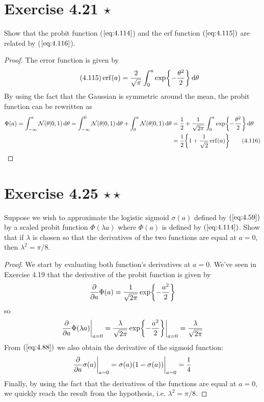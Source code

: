 \section*{Exercise 4.21 $\star$}
Show that the probit function ($\ref{eq:4.114}$) and the erf function $(\ref{eq:4.115})$ are
related by ($\ref{eq:4.116}$).

\vspace{1em}

\begin{proof}
    The error function is given by
    \begin{equation}\label{eq:4.115}\tag{4.115}
        \erf(a) = \frac{2}{\sqrt{\pi}} \int_{0}^{a} \exp{-\frac{\theta^2}{2}} \diff \theta
    \end{equation}
    By using the fact that the Gaussian is symmetric around the mean, 
    the probit function can be rewritten as
    \begin{align*}
        \Phi(a) 
        = \int_{-\infty}^{a} \mathcal{N}(\theta | 0, 1) \diff \theta
        = \int_{-\infty}^{0} \mathcal{N}(\theta | 0, 1) \diff \theta
        + \int_{0}^{a} \mathcal{N}(\theta | 0, 1) \diff \theta
        &= \frac{1}{2} + \frac{1}{\sqrt{2\pi}} \int_{0}^{a} \exp{-\frac{\theta^2}{2}} \diff \theta \\
        &= \frac{1}{2} \bigg\{1 + \frac{1}{\sqrt{2}} \erf(a)\bigg\} \label{eq:4.116}\tag{4.116}
    \end{align*}
\end{proof}

\section*{Exercise 4.25 $\star \star$}
Suppose we wish to approximate the logistic sigmoid $\sigma(a)$ 
defined by $(\ref{eq:4.59})$ by a scaled probit function
$\Phi(\lambda a)$ where $\Phi(a)$ is defined by $(\ref{eq:4.114})$.
Show that if $\lambda$ is chosen so that the derivatives of the two
functions are equal at $a = 0$, then  $\lambda^2 = \pi/8$.

\vspace{1em}

\begin{proof}
    We start by evaluating both function's derivatives at $a=0$.
    We've seen in Exercise 4.19 that the derivative of the probit function
    is given by
     \[
         \pdv{a} \Phi(a) = \frac{1}{\sqrt{2\pi}} \exp{-\frac{a^2}{2}}
    \] 
    so
    \[
        \pdv{a} \Phi(\lambda a)\bigg|_{a=0}
        = \frac{\lambda}{\sqrt{2\pi}} \exp{-\frac{a^2}{2}}\bigg|_{a=0}
        = \frac{\lambda}{\sqrt{2\pi}}
    \] 
    From $(\ref{eq:4.88})$ we also obtain the derivative of the sigmoid function:
     \[
         \pdv{a} \sigma(a)\bigg|_{a=0} = \sigma(a)(1 - \sigma(a))\bigg|_{a = 0}
         = \frac{1}{4}
    \] 
    Finally, by using the fact that the derivatives of the functions are
    equal at $a=0$, we quickly reach the result from the hypothesis, 
    i.e. $\lambda^2 = \pi / 8$.
\end{proof}
